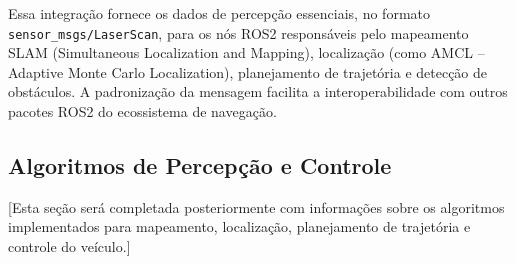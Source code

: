 Essa integração fornece os dados de percepção essenciais, no formato
\texttt{sensor\_msgs/LaserScan}, para os nós ROS2 responsáveis pelo mapeamento
SLAM (Simultaneous Localization and Mapping), localização (como AMCL --
Adaptive Monte Carlo Localization), planejamento de trajetória e detecção de
obstáculos. A padronização da mensagem facilita a interoperabilidade com outros
pacotes ROS2 do ecossistema de navegação.

\subsection{Algoritmos de Percepção e Controle}

[Esta seção será completada posteriormente com informações sobre os algoritmos implementados para mapeamento, localização, planejamento de trajetória e controle do veículo.]
